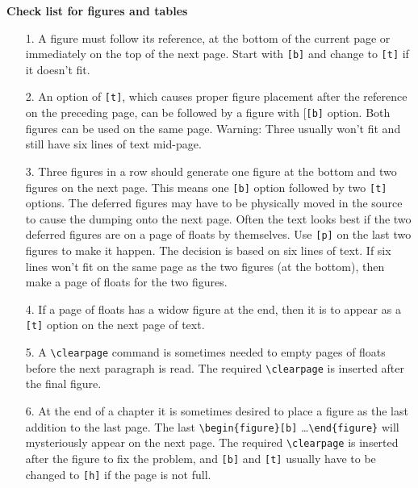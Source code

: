 \begin{center}\large\bf Check list for figures and tables\end{center}
\begin{itemize}
\item[1.] A figure must follow its reference, at the bottom of the
          current page or immediately on the top of the next page.
          Start with \verb"[b]" and change to \verb"[t]" if it doesn't
          fit.

\item[2.] An option of \verb"[t]", which causes proper figure
          placement after the reference on the preceding page, can be
          followed by a figure with [\verb"[b]" option. Both figures can
          be used on the same page. Warning: Three usually won't fit and
          still have six lines of text mid-page.

\item[3.] Three figures in a row should generate one figure at the
          bottom and two figures on the next page. This means one
          \verb"[b]" option followed by two \verb"[t]" options. The
          deferred figures may have to be physically moved in the source
          to cause the dumping onto the next page. Often the text looks
          best if the two deferred figures are on a page of floats by
          themselves. Use \verb"[p]" on the last two figures to make it
          happen. The decision is based on six lines of text. If six
          lines won't fit on the same page as the two figures (at the
          bottom), then make a page of floats for the two figures.

\item[4.] If a page of floats has a widow figure at the end, then it
          is to appear as a \verb"[t]" option on the next page of text.

\item[5.] A \verb"\clearpage" command is sometimes needed to empty pages
          of floats before the next paragraph is read. The required
          \verb"\clearpage" is inserted after the final figure.

\item[6.] At the end of a chapter it is sometimes desired to place a
          figure as the last addition to the last page. The  last
          \verb"\begin{figure}[b]" \ldots \verb"\end{figure}" will
          mysteriously appear on the next page.
          The required \verb"\clearpage" is inserted after the figure to
          fix the problem, and \verb"[b]" and \verb"[t]" usually have to
          be changed to \verb"[h]" if the page is not full.


\end{itemize}
